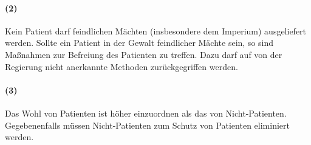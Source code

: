 \paragraph{(2)} Kein Patient darf feindlichen Mächten (insbesondere dem Imperium) ausgeliefert werden. Sollte ein Patient in der Gewalt feindlicher Mächte sein, so sind Maßnahmen zur Befreiung des Patienten zu treffen. Dazu darf auf von der Regierung nicht anerkannte Methoden zurückgegriffen werden.
\paragraph{(3)} Das Wohl von Patienten ist höher einzuordnen als das von Nicht-Patienten. Gegebenenfalls müssen Nicht-Patienten zum Schutz von Patienten eliminiert werden.


